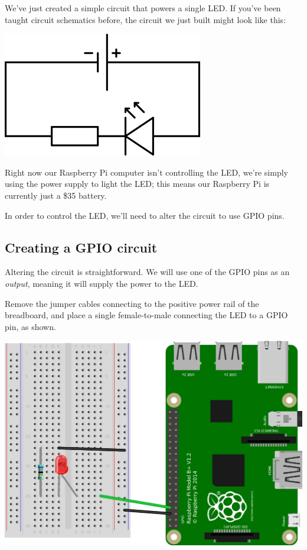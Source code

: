 		We've just created a simple circuit that powers a single LED. If you've been taught circuit schematics before, the circuit we just built might look like this:
		
		\begin{center}
			\includegraphics[width=0.5\linewidth]{McrRaspJam/015_GPIOZero/1_simplecircuit/schematic}
		\end{center}
		
		Right now our Raspberry Pi computer isn't controlling the LED, we're simply using the power supply to light the LED; this means our Raspberry Pi is currently just a \$35 battery.
		
		In order to control the LED, we'll need to alter the circuit to use GPIO pins.
		
		\subsection{Creating a GPIO circuit}
		
		Altering the circuit is straightforward. We will use one of the GPIO pins as an \textit{output}, meaning it will supply the power to the LED.
		
		Remove the jumper cables connecting to the positive power rail of the breadboard, and place a single female-to-male connecting the LED to a GPIO pin, as shown.
		
		\begin{center}
			\includegraphics[width=0.7\linewidth]{McrRaspJam/015_GPIOZero/1_simplecircuit/6}
		\end{center}
	

